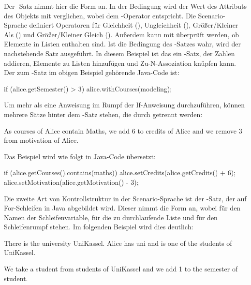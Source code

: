 Der -Satz nimmt hier die Form  an.
In der Bedingung wird der Wert des Attributs  des Objekts  mit  verglichen, wobei  dem \code{>}-Operator entspricht.
Die Scenario-Sprache definiert Operatoren für Gleichheit (), Ungleichheit (), Größer/Kleiner Als () und Größer/Kleiner Gleich ().
Außerdem kann mit  überprüft werden, ob Elemente in Listen enthalten sind.
Ist die Bedingung des -Satzes wahr, wird der nachstehende Satz ausgeführt.
In diesem Beispiel ist das ein -Satz, der Zahlen addieren, Elemente zu Listen hinzufügen und Zu-N-Assoziation knüpfen kann.
Der zum -Satz im obigen Beispiel gehörende Java-Code ist:

\begin{jcodeblock}
    if (alice.getSemester() > 3) {
        alice.withCourses(modeling);
    }
\end{jcodeblock}

Um mehr als eine Anweisung im Rumpf der If-Anweisung durchzuführen, können mehrere Sätze hinter dem -Satz stehen, die durch  getrennt werden:

\begin{codeblock}
    As courses of Alice contain Maths, we add 6 to credits of Alice
    and we remove 3 from motivation of Alice.
\end{codeblock}

Das Beispiel wird wie folgt in Java-Code übersetzt:

\begin{jcodeblock}
    if (alice.getCourses().contains(maths)) {
        alice.setCredits(alice.getCredits() + 6);
        alice.setMotivation(alice.getMotivation() - 3);
    }
\end{jcodeblock}

Die zweite Art von Kontrollstruktur in der Scenario-Sprache ist der -Satz, der auf For-Schleifen in Java abgebildet wird.
Dieser nimmt die Form  an, wobei  für den Namen der Schleifenvariable,  für die zu durchlaufende Liste und  für den Schleifenrumpf stehen.
Im folgenden Beispiel wird dies deutlich:

\begin{codeblock}
    There is the university UniKassel.
    Alice has uni and is one of the students of UniKassel.

    We take a student from students of UniKassel and we add 1 to the semester of student.
\end{codeblock}

